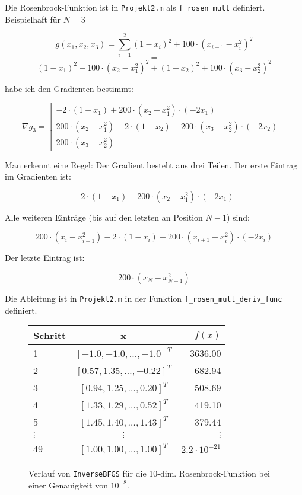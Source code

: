 \documentclass[a4paper, 12pt]{report}
\begin{document}
Die Rosenbrock-Funktion ist in \lstinline[basicstyle=\ttfamily\color{black}]|Projekt2.m| als 
\lstinline[basicstyle=\ttfamily\color{black}]|f_rosen_mult| definiert. Beispielhaft für $N = 3$

  $$g(x_1, x_2, x_3) = \sum_{i=1}^2 (1 - x_i)^2 + 100\cdot(x_{i+1} - x_i^2)^2$$
  $$=$$
  $$(1 - x_1)^2 + 100\cdot (x_2 - x_1^2)^2 + (1 - x_2)^2 + 100\cdot(x_3 - x_2^2)^2$$

habe ich den Gradienten bestimmt:

\def\arraystretch{1.25}
  $$\nabla g_3 = \begin{bmatrix}-2\cdot(1 - x_1) + 200\cdot(x_2 - x_1^2)\cdot(-2x_1)\\
    200\cdot(x_2 - x_1^2) - 2\cdot(1 - x_2) + 200\cdot(x_3 - x_2^2)\cdot(-2x_2)\\
    200\cdot(x_3 - x_2^2)\end{bmatrix}$$

Man erkennt eine Regel: Der Gradient besteht aus drei Teilen. Der erste Eintrag im Gradienten ist:

$$-2\cdot(1 - x_1) + 200\cdot(x_2 - x_1^2)\cdot(-2x_1)$$

Alle weiteren Einträge (bis auf den letzten an Position $N-1$) sind:

$$200\cdot(x_i - x_{i-1}^2) - 2\cdot(1 - x_i) + 200\cdot(x_{i+1} - x_i^2)\cdot(-2x_i)$$

Der letzte Eintrag ist:

$$200\cdot(x_N - x_{N-1}^2)$$

Die Ableitung ist in \lstinline[basicstyle=\ttfamily\color{black}]|Projekt2.m| in der Funktion
\lstinline[basicstyle=\ttfamily\color{black}]|f_rosen_mult_deriv_func| definiert.

\begin{figure}[H]
  \centering
  \def\arraystretch{1.25}
  \begin{tabular}{l|c|r}
    \hline
    \textbf{Schritt} & \textbf{x} & \textbf{$f(x)$}\\
    \hline
    1 & $[-1.0, -1.0, \ldots, -1.0]^T$ & 3636.00\\
    2 & $[0.57, 1.35, \ldots, -0.22]^T$ & 682.94\\
    3 & $[0.94, 1.25, \ldots, 0.20]^T$ & 508.69\\
    4 & $[1.33, 1.29, \ldots, 0.52]^T$ & 419.10\\
    5 & $[1.45, 1.40, \ldots, 1.43]^T$ & 379.44\\
    $\vdots$ & $\vdots$ & $\vdots$\\
    49 & $[1.00, 1.00, \ldots, 1.00]^T$ & $2.2\cdot 10^{-21}$\\
    \hline
  \end{tabular}
  \caption{Verlauf von \lstinline[basicstyle=\ttfamily\color{black}]|InverseBFGS| für die 10-dim. Rosenbrock-Funktion bei einer Genauigkeit von
          $10^{-8}$.}
\end{figure}
\end{document}
